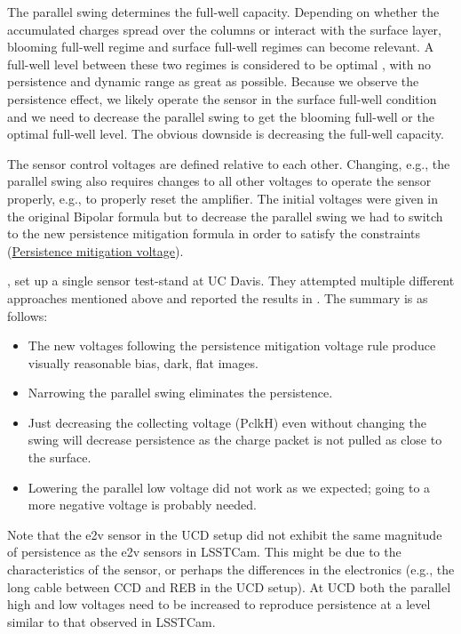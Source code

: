 The parallel swing determines the full-well capacity. Depending on whether the
accumulated charges spread over the columns or interact with the surface
layer, blooming full-well regime and surface full-well
regimes can become relevant. A full-well level between these two regimes is considered to be
optimal \citep{2001sccd.book.....J}, with no persistence and dynamic range as great as
possible. Because we observe the persistence effect, we likely operate the sensor in the
surface full-well condition and we need to decrease the parallel swing to
get the blooming full-well or the optimal full-well level. The obvious downside is
decreasing the full-well capacity.

The sensor control voltages are defined relative to each other. Changing, e.g., the parallel
swing also requires changes to all other voltages to
operate the sensor properly, e.g., to properly reset the amplifier.
The initial voltages were given in the original Bipolar formula
 but to decrease the parallel swing we had
to switch to the new persistence mitigation formula in order to satisfy the constraints (\href{https://github.com/lsst-camera-dh/e2v_voltages/blob/main/setup_e2v_v4.py}{Persistence mitigation voltage}).

\citet{2024SPIE13103E..21S}, set up a single sensor test-stand at UC
Davis. They attempted multiple different approaches mentioned above and
reported the results in \citet{2025arXiv250205418P}. 
The summary is as follows:

\begin{itemize}
\tightlist
\item
  The new voltages following the persistence mitigation voltage rule produce visually reasonable bias, dark, flat images.
\item
  Narrowing the parallel swing eliminates the persistence.
\item Just decreasing the collecting voltage (PclkH) even without changing the swing will decrease persistence as the charge packet is not pulled as close to the surface. 
\item
  Lowering the parallel low voltage did not work
  as we expected; going to a more negative voltage is probably needed.
  \end{itemize}

Note that the e2v sensor in the UCD setup did not exhibit the same magnitude of persistence as the e2v sensors in LSSTCam.
This might be due to the characteristics of the sensor, or perhaps
the differences in the electronics (e.g., the long cable between CCD and REB in the UCD setup). At UCD both the parallel high and low voltages need to be increased to reproduce persistence at a level similar to that observed in LSSTCam.


